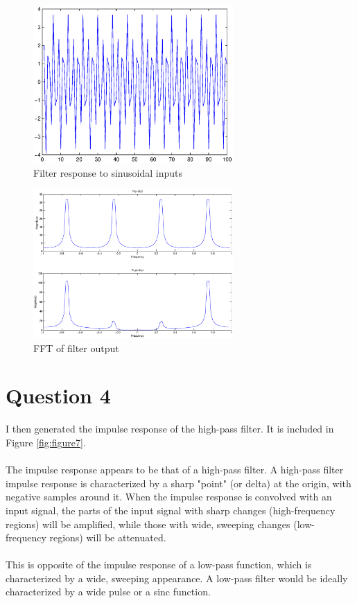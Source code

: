 \documentclass{article}
\begin{document}
\begin{figure}[htp]
	\begin{center}
		\includegraphics [width=3.0in]{filterresp.eps}
		\caption{Filter response to sinusoidal inputs}
		\label{fig:figure6}
	\end{center}
\end{figure}

\begin{figure}[htp]
	\begin{center}
		\includegraphics [width=3.0in]{fft.eps}
		\caption{FFT of filter output}
		\label{fig:fft}
	\end{center}
\end{figure}

\section*{Question 4}
\begin{par}
I then generated the impulse response of the high-pass filter.  It is included in Figure \ref{fig:figure7}.  \\
\\
The impulse response appears to be that of a high-pass filter.  A high-pass filter impulse response is characterized by a sharp "point" (or delta) at the origin, with negative samples around it.  When the impulse response is convolved with an input signal, the parts of the input signal with sharp changes (high-frequency regions) will be amplified, while those with wide, sweeping changes (low-frequency regions) will be attenuated.\\
\\
This is opposite of the impulse response of a low-pass function, which is characterized by a wide, sweeping appearance.  A low-pass filter would be ideally characterized by a wide pulse or a sinc function.
\end{par}
\end{document}
